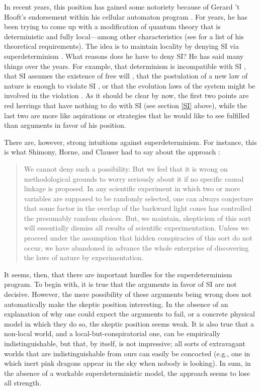 \documentclass[letterpaper,12pt]{article}
\begin{document}
In recent years, this position has gained some notoriety because of Gerard 't Hooft’s endorsement within his cellular automaton program \cite{Hooft2016}. For years, he has been trying to come up with a modification of quantum theory that is deterministic and fully local---among other characteristics (see \cite{Hooft2017} for a list of his theoretical requirements). The idea is to maintain locality by denying SI via superdeterminism \cite[p. 14]{Hooft2017}. What reasons does he have to deny SI? He has said many things over the years. For example, that determinism is incompatible with SI \cite[p. 2-3]{Hooft2011}, that SI assumes the existence of free will \cite[p. 3-4]{Hooft2013}, that the postulation of a new law of nature is enough to violate SI \cite[p. 12]{Hooft2013}, or that the evolution laws of the system might be involved in the violation \cite[p. 10]{Hooft2009}. As it should be clear by now, the first two points are red herrings that have nothing to do with SI (see section \ref{SI} above), while the last two are more like aspirations or strategies that he would like to see fulfilled than arguments in favor of his position.

There are, however, strong intuitions against superdeterminism. For instance, this is what Shimony, Horne, and Clauser had to say about the approach \cite{SHC}:
\begin{quotation}
We cannot deny such a possibility. But we feel that it is wrong on methodological grounds to worry seriously about it if no specific causal linkage is proposed. In any scientific experiment in which two or more variables are supposed to be randomly selected, one can always conjecture that some factor in the overlap of the backward light cones has controlled the presumably random choices. But, we maintain, skepticism of this sort will essentially dismiss all results of scientific experimentation. Unless we proceed under the assumption that hidden conspiracies of this sort do not occur, we have abandoned in advance the whole enterprise of discovering the laws of nature by experimentation.
\end{quotation}

It seems, then, that there are important hurdles for the superdeterminism program. To begin with, it is true that the arguments in favor of SI are not decisive. However, the mere possibility of these arguments being wrong does not automatically make the skeptic position interesting. In the absence of an explanation of why one could expect the arguments to fail, or a concrete physical model in which they do so, the skeptic position seems weak. It is also true that a non-local world, and a local-but-conspiratorial one, can be empirically indistinguishable, but that, by itself, is not impressive; all sorts of extravagant worlds that are indistinguishable from ours can easily be concocted (e.g., one in which inert pink dragons appear in the sky when nobody is looking). In sum, in the absence of a workable superdeterministic model, the approach seems to lose all strength.
\end{document}
